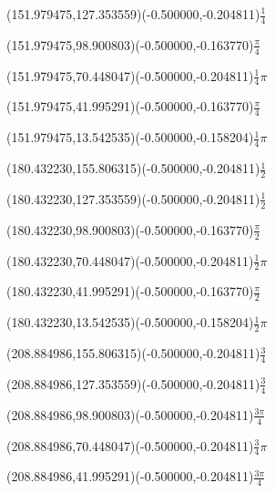 \documentclass[12pt]{article}
\begin{document}
\ASYalign(151.979475,127.353559)(-0.500000,-0.204811){$\frac{1}{4}$}%
%
%
\fontsize{12.000000}{14.400000}\selectfont%
\ASYalign(151.979475,98.900803)(-0.500000,-0.163770){$\frac{\pi}{4}$}%
%
%
\fontsize{12.000000}{14.400000}\selectfont%
\ASYalign(151.979475,70.448047)(-0.500000,-0.204811){$\frac{1}{4}\pi$}%
%
%
\fontsize{12.000000}{14.400000}\selectfont%
\ASYalign(151.979475,41.995291)(-0.500000,-0.163770){$\frac{\pi}{4}$}%
%
%
\fontsize{12.000000}{14.400000}\selectfont%
\ASYalign(151.979475,13.542535)(-0.500000,-0.158204){$\displaystyle \frac{1}{4}\pi$}%
%
%
\fontsize{12.000000}{14.400000}\selectfont%
\ASYalign(180.432230,155.806315)(-0.500000,-0.204811){$\frac{1}{2}$}%
%
%
\fontsize{12.000000}{14.400000}\selectfont%
\ASYalign(180.432230,127.353559)(-0.500000,-0.204811){$\frac{1}{2}$}%
%
%
\fontsize{12.000000}{14.400000}\selectfont%
\ASYalign(180.432230,98.900803)(-0.500000,-0.163770){$\frac{\pi}{2}$}%
%
%
\fontsize{12.000000}{14.400000}\selectfont%
\ASYalign(180.432230,70.448047)(-0.500000,-0.204811){$\frac{1}{2}\pi$}%
%
%
\fontsize{12.000000}{14.400000}\selectfont%
\ASYalign(180.432230,41.995291)(-0.500000,-0.163770){$\frac{\pi}{2}$}%
%
%
\fontsize{12.000000}{14.400000}\selectfont%
\ASYalign(180.432230,13.542535)(-0.500000,-0.158204){$\displaystyle \frac{1}{2}\pi$}%
%
%
\fontsize{12.000000}{14.400000}\selectfont%
\ASYalign(208.884986,155.806315)(-0.500000,-0.204811){$\frac{3}{4}$}%
%
%
\fontsize{12.000000}{14.400000}\selectfont%
\ASYalign(208.884986,127.353559)(-0.500000,-0.204811){$\frac{3}{4}$}%
%
%
\fontsize{12.000000}{14.400000}\selectfont%
\ASYalign(208.884986,98.900803)(-0.500000,-0.204811){$\frac{3\pi}{4}$}%
%
%
\fontsize{12.000000}{14.400000}\selectfont%
\ASYalign(208.884986,70.448047)(-0.500000,-0.204811){$\frac{3}{4}\pi$}%
%
%
\fontsize{12.000000}{14.400000}\selectfont%
\ASYalign(208.884986,41.995291)(-0.500000,-0.204811){$\frac{3\pi}{4}$}%
\end{document}
